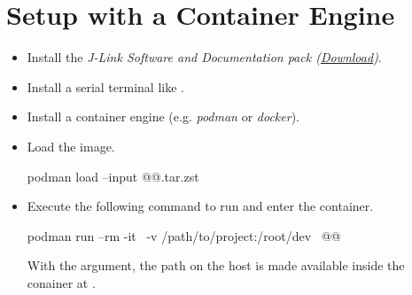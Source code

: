 \section{Setup with a Container Engine}

\begin{itemize}
  \item Install the \emph{J-Link Software and Documentation pack (\href{https://www.segger.com/downloads/jlink}{Download})}.
  \item Install a serial terminal like .
  \item Install a container engine (e.g. \emph{podman} or \emph{docker}).
  \item Load the image.
        \begin{monobox}
podman load --input @\imagename{}@.tar.zst
\end{monobox}
  \item Execute the following command to run and enter the container.
        \begin{monobox}
podman run --rm -it \
  -v /path/to/project:/root/dev \
  @\imagename{}@
\end{monobox}
    With the  argument, the  path on the host is made available inside the conainer at .
\end{itemize}
